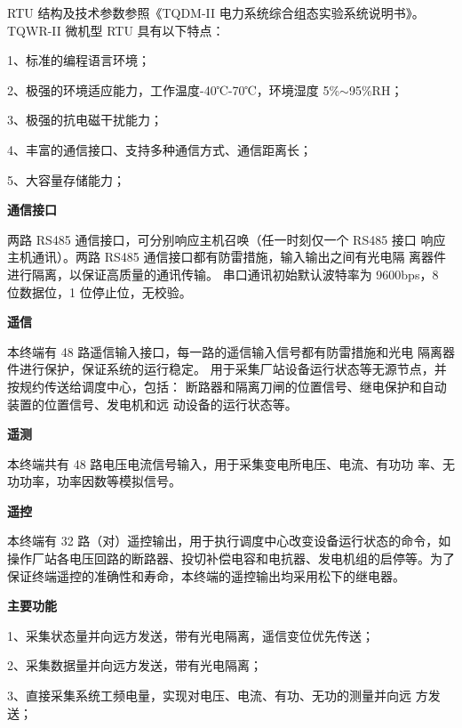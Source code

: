 \documentclass[a4paper]{ctexrep}
\begin{document}
                RTU 结构及技术参数参照《TQDM-II 电力系统综合组态实验系统说明书》。 TQWR-II 微机型 RTU 具有以下特点： 
                
                1、标准的编程语言环境； 
                
                2、极强的环境适应能力，工作温度-40℃-70℃，环境湿度 5\%$\sim$95\%RH； 
                
                3、极强的抗电磁干扰能力； 
                
                4、丰富的通信接口、支持多种通信方式、通信距离长； 
                
                5、大容量存储能力；

                \textbf{通信接口}
                
                两路 RS485 通信接口，可分别响应主机召唤（任一时刻仅一个 RS485 接口 响应主机通讯）。两路 RS485 通信接口都有防雷措施，输入输出之间有光电隔 离器件进行隔离，以保证高质量的通讯传输。 串口通讯初始默认波特率为 9600bps，8 位数据位，1 位停止位，无校验。

                \textbf{遥信 }
                
                本终端有 48 路遥信输入接口，每一路的遥信输入信号都有防雷措施和光电 隔离器件进行保护，保证系统的运行稳定。 用于采集厂站设备运行状态等无源节点，并按规约传送给调度中心，包括： 断路器和隔离刀闸的位置信号、继电保护和自动装置的位置信号、发电机和远 动设备的运行状态等。 
                
                \textbf{遥测 }
                
                本终端共有 48 路电压电流信号输入，用于采集变电所电压、电流、有功功 率、无功功率，功率因数等模拟信号。 
                
                \textbf{遥控 }
                
                本终端有 32 路（对）遥控输出，用于执行调度中心改变设备运行状态的命令，如操作厂站各电压回路的断路器、投切补偿电容和电抗器、发电机组的启停等。为了保证终端遥控的准确性和寿命，本终端的遥控输出均采用松下的继电器。 
                
                \textbf{主要功能 }
                
                1、采集状态量并向远方发送，带有光电隔离，遥信变位优先传送； 
                
                2、采集数据量并向远方发送，带有光电隔离； 
                
                3、直接采集系统工频电量，实现对电压、电流、有功、无功的测量并向远 方发送； 
                
\end{document}
